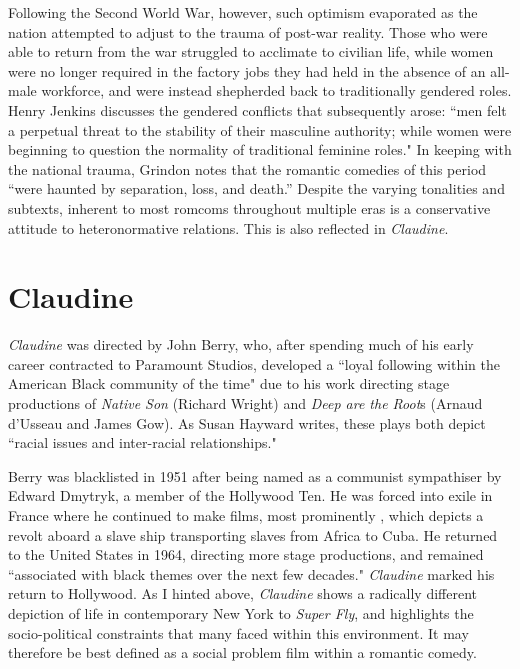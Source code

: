 Following the Second World War, however, such optimism evaporated as the nation attempted to adjust to the trauma of post-war reality.
Those who were able to return from the war struggled to acclimate to civilian life, while women were no longer required in the factory jobs they had held in the absence of an all-male workforce, and were instead shepherded back to traditionally gendered roles.
Henry Jenkins discusses the gendered conflicts that subsequently arose: “men felt a perpetual threat to the stability of their masculine authority; while women were beginning to question the normality of traditional feminine roles."\autocite[][253]{jenkins_laughingstock_1995}
In keeping with the national trauma, Grindon notes that the romantic comedies of this period “were haunted by separation, loss, and death.”\autocite[][43]{grindon_hollywood_2011}
Despite the varying tonalities and subtexts, inherent to most romcoms throughout multiple eras is a conservative attitude to heteronormative relations. 
This is also reflected in \textit{Claudine}.


\section{Claudine}


\textit{Claudine} was directed by John Berry, who, after spending much of his early career contracted to Paramount Studios, developed a ``loyal following within the American Black community of the time" due to his work directing stage productions of \textit{Native Son} (Richard Wright) and \textit{Deep are the Root}s (Arnaud d'Usseau and James Gow).\autocite[][210]{hayward_french_2010}
As Susan Hayward writes, these plays both depict ``racial issues and inter-racial relationships."\autocite[][210]{hayward_french_2010}

Berry was blacklisted in 1951 after being named as a communist sympathiser by Edward Dmytryk, a member of the Hollywood Ten.
He was forced into exile in France where he continued to make films, most prominently \textcite{berry_tamango_1958}, which depicts a revolt aboard a slave ship transporting slaves from Africa to Cuba.
He returned to the United States in 1964, directing more stage productions, and remained ``associated with black themes over the next few decades."\autocite[][]{bergan_obituary_1999}
\textit{Claudine} marked his return to Hollywood.
As I hinted above, \textit{Claudine} shows a radically different depiction of life in contemporary New York to \textit{Super Fly}, and highlights the socio-political constraints that many faced within this environment.
It may therefore be best defined as a social problem film within a romantic comedy. 


